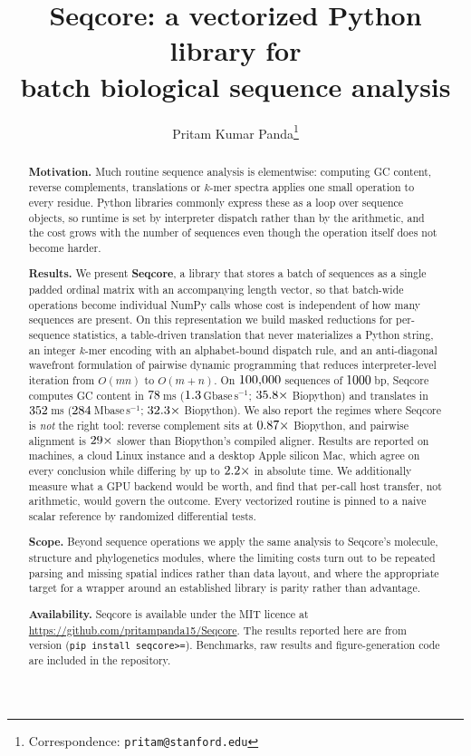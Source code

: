 \documentclass[10pt,letterpaper]{article}
\title{\vspace{-1.2cm}\textbf{Seqcore: a vectorized Python library for\\
batch biological sequence analysis}}
\author[1]{Pritam Kumar Panda\thanks{Correspondence: \texttt{pritam@stanford.edu}}}
\affil[1]{Stanford University, Stanford, CA, USA}
\date{}
\begin{document}
\maketitle
\vspace{-0.9cm}

\begin{abstract}
\noindent
\textbf{Motivation.} Much routine sequence analysis is elementwise: computing GC
content, reverse complements, translations or $k$-mer spectra applies one small
operation to every residue. Python libraries commonly express these as a loop
over sequence objects, so runtime is set by interpreter dispatch rather than by
the arithmetic, and the cost grows with the number of sequences even though the
operation itself does not become harder.

\noindent
\textbf{Results.} We present \textbf{Seqcore}, a library that stores a batch of
sequences as a single padded ordinal matrix with an accompanying length vector,
so that batch-wide operations become individual NumPy calls whose cost is
independent of how many sequences are present. On this representation we build
masked reductions for per-sequence statistics, a table-driven translation that
never materializes a Python string, an integer $k$-mer encoding with an
alphabet-bound dispatch rule, and an anti-diagonal wavefront formulation of
pairwise dynamic programming that reduces interpreter-level iteration from
$O(mn)$ to $O(m+n)$. On $100{,}000$ sequences of $1000$\,bp, Seqcore
computes GC content in $78$\,ms ($1.3$\,Gbase\,s$^{-1}$;
$35.8\times$ Biopython) and translates in $352$\,ms
($284$\,Mbase\,s$^{-1}$; $32.3\times$ Biopython). We also
report the regimes where Seqcore is \emph{not} the right tool: reverse
complement sits at $0.87\times$ Biopython, and pairwise alignment is
$29\times$ slower than Biopython's compiled aligner. \ifMultiMachine Results are
reported on \NumMachines{} machines, a cloud Linux instance and a desktop
Apple silicon Mac, which agree on every conclusion while differing by up to
$2.2\times$ in absolute time. \fi We additionally measure what a GPU
backend would be worth, and find that per-call host transfer, not arithmetic,
would govern the outcome. Every vectorized routine is pinned to a naive scalar
reference by randomized differential tests.

\noindent
\textbf{Scope.} Beyond sequence operations we apply the same analysis to
Seqcore's molecule, structure and phylogenetics modules, where the limiting
costs turn out to be repeated parsing and missing spatial indices rather than
data layout, and where the appropriate target for a wrapper around an
established library is parity rather than advantage.

\noindent
\textbf{Availability.} Seqcore is available under the MIT licence at
\url{https://github.com/pritampanda15/Seqcore}. The results reported here are
from version \SeqcoreVersion{} (\texttt{pip install seqcore>=\SeqcoreVersion}). Benchmarks, raw results and figure-generation code
are included in the repository.
\end{abstract}
\end{document}
